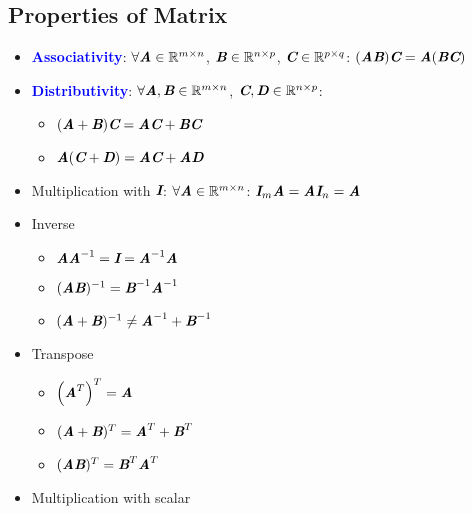 \documentclass[12pt]{article}
\theoremstyle{definition}
\newcommand{\subkeyword}[1]{\textbf{\textcolor{blue}{#1}}}
\newcommand{\mat}[1]{\textit{\textbf{#1}}}
\newcommand{\inverse}[1]{\textit{\textbf{#1}}^{-1}}
\newcommand{\transpose}[1]{\textit{\textbf{#1}}^{T}}
\newcommand{\rspace}[2]{\mathbb{R}^{#1 \times #2}}
\begin{document}
        \subsection{Properties of Matrix}
            \begin{itemize}
                \item \subkeyword{Associativity}:
                    $\forall \mat{A}\in\rspace{m}{n}$, 
                    $\mat{B}\in\rspace{n}{p}$, 
                    $\mat{C}\in\rspace{p}{q}$: 
                    $(\mat{A}\mat{B})\mat{C} = \mat{A}(\mat{B}\mat{C})$
                \item \subkeyword{Distributivity}:
                    $\forall \mat{A}, \mat{B}\in\rspace{m}{n}$, 
                    $\mat{C}, \mat{D}\in\mathbb{R}^{n\times p}$:
                    \begin{itemize}
                        \item $(\mat{A}+\mat{B})\mat{C}=\mat{A}\mat{C}+\mat{B}\mat{C}$
                        \item $\mat{A}(\mat{C}+\mat{D})=\mat{A}\mat{C}+\mat{A}\mat{D}$
                    \end{itemize} 
                \item Multiplication with $\mat{I}$:
                    $\forall \mat{A}\in\rspace{m}{n}$:
                    $\mat{I}_m\mat{A}=\mat{A}\mat{I}_n=\mat{A}$
                \item Inverse 
                    \begin{itemize}
                        \item $\mat{A}\inverse{A}=\mat{I}=\inverse{A}\mat{A}$
                        \item $(\mat{A}\mat{B})^{-1} = \inverse{B}\inverse{A}$
                        \item $(\mat{A}+\mat{B})^{-1} \neq \inverse{A} + \inverse{B}$
                    \end{itemize}
                \item Transpose 
                    \begin{itemize}
                        \item $\left(\transpose{A}\right)^T=\mat{A}$
                        \item $(\mat{A}+\mat{B})^T=\transpose{A}+\transpose{B}$
                        \item $(\mat{A}\mat{B})^T=\transpose{B}\transpose{A}$
                    \end{itemize}
                \item Multiplication with scalar 

\end{itemize}
\end{document}

